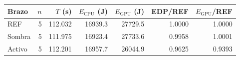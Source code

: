 \begin{tabular}{@{}lrrrrrr@{}}
\toprule
\textbf{Brazo} & \textbf{$n$} & \textbf{$T$ (s)} & \textbf{$E_{\mathrm{CPU}}$ (J)} & \textbf{$E_{\mathrm{GPU}}$ (J)} & \textbf{EDP/REF} & \textbf{$E_{\mathrm{GPU}}$/REF} \\
\midrule
REF & 5 & 112.032 & 16939.3 & 27729.5 & 1.0000 & 1.0000 \\
Sombra & 5 & 111.975 & 16923.4 & 27733.6 & 0.9958 & 1.0001 \\
Activo & 5 & 112.201 & 16957.7 & 26044.9 & 0.9625 & 0.9393 \\
\bottomrule
\end{tabular}
